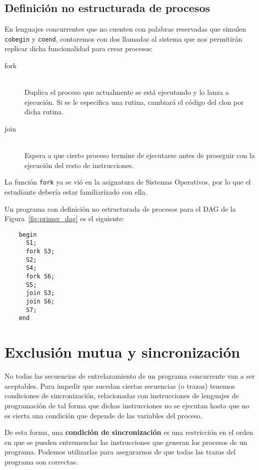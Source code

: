 \subsection{Definición no estructurada de procesos}
En lenguajes concurrentes que no cuenten con palabras reservadas que simulen \verb|cobegin| y \verb|coend|, contaremos con dos llamadas al sistema que nos permitirán replicar dicha funcionalidad para crear procesos:
\begin{description}
    \item [fork]~\\
        Duplica el proceso que actualmente se está ejecutando y lo lanza a ejecución. Si se le especifica una rutina, cambiará el código del clon por dicha rutina.
    \item [join]~\\
        Espera a que cierto proceso termine de ejecutarse antes de proseguir con la ejecución del resto de instrucciones.
\end{description}
La función \verb|fork| ya se vió en la asignatura de Sistemas Operativos, por lo que el estudiante debería estar familiarizado con ella.

\begin{ejemplo}
    Un programa con definición no estructurada de procesos para el DAG de la Figura~\ref{fig:primer_dag} es el siguiente:
    \begin{verbatim}
    begin        
      S1;
      fork S3;
      S2;
      S4;
      fork S6;
      S5;
      join S3;
      join S6;
      S7;
    end
    \end{verbatim}
\end{ejemplo}

\section{Exclusión mutua y sincronización}
No todas las secuencias de entrelazamiento de un programa concurrente van a ser aceptables. Para impedir que sucedan ciertas secuencias (o trazas) tenemos condiciones de sincronización, relacionadas con instrucciones de lenguajes de programación de tal forma que dichas instrucciones no se ejecutan hasta que no es cierta una condición que depende de las variables del proceso.

De esta forma, una \textbf{condición de sincronización} es una restricción en el orden en que se pueden entremezclar las instrucciones que generan los procesos de un programa. Podemos utilizarlas para asegurarnos de que todas las trazas del programa son correctas.\\


